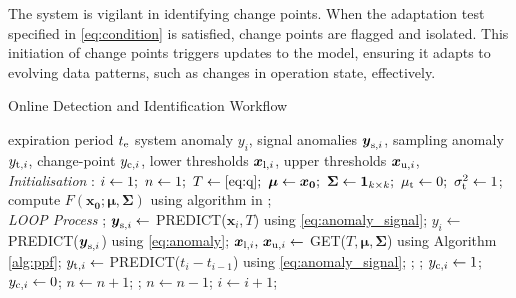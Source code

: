 The system is vigilant in identifying change points. When the adaptation test specified in \eqref{eq:condition} is satisfied, change points are flagged and isolated. This initiation of change points triggers updates to the model, ensuring it adapts to evolving data patterns, such as changes in operation state, effectively.

\begin{algorithm}[H]
  \caption{{Online Detection and Identification Workflow}} \label{alg:detector}
  \begin{algorithmic}[1]
    \renewcommand{\algorithmicrequire}{\textbf{Input:}}
    \renewcommand{\algorithmicensure}{\textbf{Output:}}
    \REQUIRE expiration period $t _{\text{e}}$
    \ENSURE system anomaly $y_i$, signal anomalies $\boldsymbol{y} _{\text{s}, i}$, sampling anomaly $y _{\text{t}, i}$, change-point $y _{\text{c}, i}$, lower thresholds $\boldsymbol{x} _{\text{l}, i}$, upper thresholds $\boldsymbol{x} _{\text{u}, i}$,
    \\ \textit{Initialisation} :
    \STATE $i \leftarrow 1;~ n \leftarrow 1;~ T \leftarrow \eqref{eq:q};~ \boldsymbol{\mu} \leftarrow \boldsymbol{x_0};~ \boldsymbol{\Sigma} \leftarrow \mathbf{1}_{k \times k};~ \mu _{\text{t}} \leftarrow 0;~ \sigma _{\text{t}}^2 \leftarrow 1$;
    \STATE compute $F(\boldsymbol{x_0}; \boldsymbol{\mu}, \boldsymbol{\Sigma})$ using algorithm in \cite{Genz2000};
    \\ \textit{LOOP Process}
    \LOOP
    ;
    \STATE $\boldsymbol{y} _{\text{s}, i} \leftarrow$ PREDICT($\boldsymbol{x}_i, T$) using \eqref{eq:anomaly_signal};
    \STATE $y_i \leftarrow$ PREDICT($\boldsymbol{y} _{\text{s}, i}$) using \eqref{eq:anomaly};
    \STATE $\boldsymbol{x} _{\text{l}, i}\text{, }\boldsymbol{x} _{\text{u}, i} \leftarrow$ GET($T, \boldsymbol{\mu}, \boldsymbol{\Sigma}$) using Algorithm \ref{alg:ppf};
    \STATE $y _{\text{t}, i} \leftarrow$ PREDICT($t_i - t_{i-1}$) using \eqref{eq:anomaly_signal};
    ;
    ;
    \IF {\eqref{eq:condition}}
    \STATE $y _{\text{c}, i} \leftarrow 1$;
    \ELSE
    \STATE $y _{\text{c}, i} \leftarrow 0$;
    \ENDIF
    \STATE $n \leftarrow n + 1$;
    ;
    \STATE $n \leftarrow n - 1$;
    \ENDFOR
    \ENDIF
    \STATE $i \leftarrow i + 1$;
    \ENDLOOP
  \end{algorithmic}
\end{algorithm}
